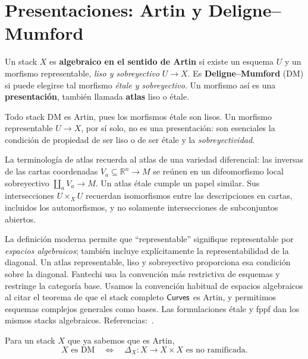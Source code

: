 \documentclass[12pt,openany]{memoir}
\begin{document}
\section{Presentaciones: Artin y Deligne--Mumford}
\label{sec:algebraic}

\begin{Def}
Un stack \(X\) es \textbf{algebraico en el sentido de Artin} si existe
un esquema \(U\) y un morfismo representable, \emph{liso y sobreyectivo}
\(U\to X\). Es \textbf{Deligne--Mumford} (DM) si puede elegirse tal
morfismo \emph{étale y sobreyectivo}. Un morfismo así es una
\textbf{presentación}, también llamada \textbf{atlas} liso o étale.
\end{Def}

Todo stack DM es Artin, pues los morfismos étale son lisos. Un morfismo
representable \(U\to X\), por sí solo, no es una presentación: son
esenciales la condición de propiedad de ser liso o de ser étale y la
\emph{sobreyectividad}.

La terminología de atlas recuerda al atlas de una variedad diferencial:
las inversas de las cartas coordenadas
\(V_a\subseteq\mathbb R^n\to M\) se reúnen en un difeomorfismo local
sobreyectivo \(\coprod_a V_a\to M\). Un atlas étale cumple un papel
similar. Sus intersecciones \(U\times_X U\) recuerdan isomorfismos entre
las descripciones en cartas, incluidos los automorfismos, y no solamente
intersecciones de subconjuntos abiertos.

\begin{nonum-Rmk}
La definición moderna permite que ``representable'' signifique
representable por \emph{espacios algebraicos}; también incluye
explícitamente la representabilidad de la diagonal. Un atlas representable,
liso y sobreyectivo proporciona esa condición sobre la diagonal. Fantechi
usa la convención más restrictiva de esquemas y restringe la categoría
base. Usamos la convención habitual de espacios algebraicos al citar el
teorema de que el stack completo \(\mathsf{Curves}\) es Artin, y permitimos
esquemas complejos generales como bases. Las formulaciones étale y fppf
dan los mismos stacks algebraicos.
Referencias:~\cite{sp:algebraic,sp:atlas,sp:etale-fppf}.
\end{nonum-Rmk}

\begin{Th}
Para un stack \(X\) que ya sabemos que es Artin,
\[
  X\text{ es DM}
  \quad\Longleftrightarrow\quad
  \Delta_X:X\longrightarrow X\times X\text{ es no ramificada}.
\]
\end{Th}
\end{document}
